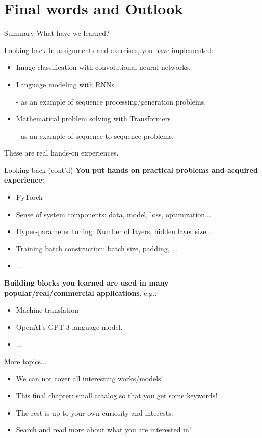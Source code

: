 \section{Final words and Outlook}

 \begin{frame}{Summary}
What have we learned?
 \end{frame}

 \begin{frame}{Looking back}
In assignments and exercises, you have implemented:
\vsp
 \begin{itemize}
 \item Image classification with convolutional neural networks.
\vsp
 \item Language modeling with RNNs.
\item[-] as an example of sequence processing/generation problems.
\vsp
 \item Mathematical problem solving with Transformers
\item[-] as an example of sequence to sequence problems.
 \end{itemize}
\vsp
These are real hands-on experiences.
 \end{frame}

 \begin{frame}{Looking back (cont'd)}
 \textbf{You put hands on practical problems and acquired experience:}
 \begin{itemize}
 \item PyTorch
 \item Sense of system components: data, model, loss, optimization...
 \item Hyper-parameter tuning: Number of layers, hidden layer size...
 \item Training batch construction: batch size, padding, ...
 \item ...
 \end{itemize}
\pause
\vsp
\textbf{Building blocks you learned are used in many popular/real/commercial applications}, e.g.:
 \begin{itemize}
\item Machine translation
\item OpenAI's GPT-3 language model.
\item ...
 \end{itemize}
 \end{frame}

\begin{frame}{More topics...}
\begin{itemize}
	\item We can not cover all interesting works/models!
	\item This final chapter: small catalog so that you get some keywords!
	\item The rest is up to your own curiosity and interests.
    \item Search and read more about what you are interested in!
\end{itemize}
\end{frame}

